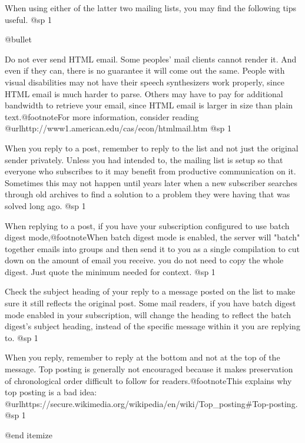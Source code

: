 When using either of the latter two mailing lists, you may find the following tips useful.
@sp 1

\itemize @bullet
\item
Do not ever send HTML email. Some peoples' mail clients cannot render it. And even if they can, there is no guarantee it will come out the same. People with visual disabilities may not have their speech synthesizers work properly, since HTML email is much harder to parse. Others may have to pay for additional bandwidth to retrieve your email, since HTML email is larger in size than plain text.@footnote{For more information, consider reading @url{http://www1.american.edu/cas/econ/htmlmail.htm}}
@sp 1

\item
When you reply to a post, remember to reply to the list and not just the original sender privately. Unless you had intended to, the mailing list is setup so that everyone who subscribes to it may benefit from productive communication on it. Sometimes this may not happen until years later when a new subscriber searches through old archives to find a solution to a problem they were having that was solved long ago.
@sp 1

\item
When replying to a post, if you have your subscription configured to use batch digest mode,@footnote{When batch digest mode is enabled, the server will "batch" together emails into groups and then send it to you as a single compilation to cut down on the amount of email you receive.} you do not need to copy the whole digest. Just quote the minimum needed for context.
@sp 1

\item
Check the subject heading of your reply to a message posted on the list to make sure it still reflects the original post. Some mail readers, if you have batch digest mode enabled in your subscription, will change the heading to reflect the batch digest's subject heading, instead of the specific message within it you are replying to.
@sp 1

\item
When you reply, remember to reply at the bottom and not at the top of the message. Top posting is generally not encouraged because it makes preservation of chronological order difficult to follow for readers.@footnote{This explains why top posting is a bad idea: @url{https://secure.wikimedia.org/wikipedia/en/wiki/Top_posting#Top-posting}.}
@sp 1

@end itemize


